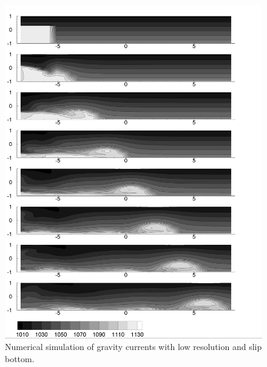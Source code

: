 \begin{figure}[htbp]
\includegraphics[width=6in]{../figures/GraCur/GraCur-1-Dom-Low-RCIP1-Slip.pdf}
\caption{Numerical simulation of gravity currents with low resolution and slip bottom.}
\label{fig:GraCur-1-Dom-Low-RCIP1-Slip}
\end{figure}

\cp
